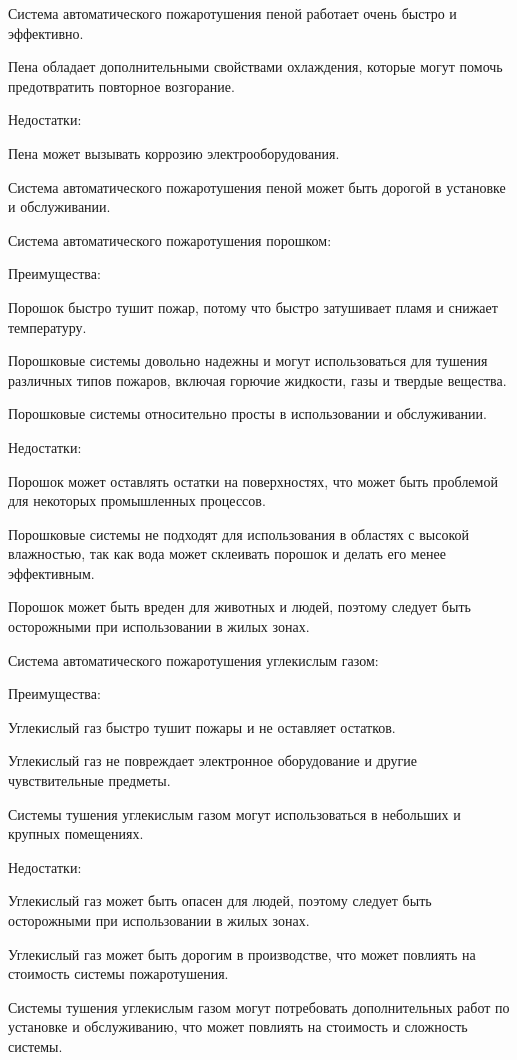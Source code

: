 \begin{multicols}{2}
Система автоматического пожаротушения пеной работает очень быстро и
эффективно.

Пена обладает дополнительными свойствами охлаждения, которые могут
помочь предотвратить повторное возгорание.

Недостатки:

Пена может вызывать коррозию электрооборудования.

Система автоматического пожаротушения пеной может быть дорогой в
установке и обслуживании.

Система автоматического пожаротушения порошком:

Преимущества:

Порошок быстро тушит пожар, потому что быстро затушивает пламя и
снижает температуру.

Порошковые системы довольно надежны и могут использоваться для тушения
различных типов пожаров, включая горючие жидкости, газы и твердые
вещества.

Порошковые системы относительно просты в использовании и обслуживании.

Недостатки:

Порошок может оставлять остатки на поверхностях, что может быть
проблемой для некоторых промышленных процессов.

Порошковые системы не подходят для использования в областях с высокой
влажностью, так как вода может склеивать порошок и делать его менее
эффективным.

Порошок может быть вреден для животных и людей, поэтому следует быть
осторожными при использовании в жилых зонах.

Система автоматического пожаротушения углекислым газом:

Преимущества:

Углекислый газ быстро тушит пожары и не оставляет остатков.

Углекислый газ не повреждает электронное оборудование и другие
чувствительные предметы.

Системы тушения углекислым газом могут использоваться в небольших и
крупных помещениях.

Недостатки:

Углекислый газ может быть опасен для людей, поэтому следует быть
осторожными при использовании в жилых зонах.

Углекислый газ может быть дорогим в производстве, что может повлиять
на стоимость системы пожаротушения.

Системы тушения углекислым газом могут потребовать дополнительных
работ по установке и обслуживанию, что может повлиять на стоимость и
сложность системы.


\end{multicols}

